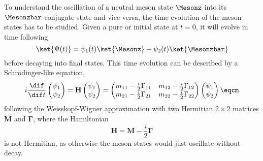 To understand the oscillation of a neutral meson state $\Mesonz$ into its
$\Mesonzbar$ \CP conjugate state and vice versa, the time evolution of the meson
states has to be studied. Given a pure \Mesonz or \Mesonzbar initial state at
$t=0$, it will evolve in time following
%
\begin{equation}
  \ket{\Psi(t)} = \psi_1(t) \ket{\Mesonz} + \psi_2(t) \ket{\Mesonzbar}
\end{equation}
%
before decaying into final states. This time evolution can be described by a
Schrödinger-like equation,
%
\begin{equation}
  i \frac{\dif}{\dif t} 
  \begin{pmatrix}
    \psi_1 \\
    \psi_2
  \end{pmatrix}
  =
  \mathbf{H}
  \begin{pmatrix}
    \psi_1 \\
    \psi_2
  \end{pmatrix}
  =
  \begin{pmatrix}
    m_{11} - \frac{i}{2} \Gamma_{11}    & m_{12} - \frac{i}{2} \Gamma_{12} \\
    m_{21} - \frac{i}{2} \Gamma_{21}    & m_{22} - \frac{i}{2} \Gamma_{22} \\
  \end{pmatrix}
  \begin{pmatrix}
    \psi_1 \\
    \psi_2
  \end{pmatrix}\eqcm
\end{equation}
%
following the Weisskopf-Wigner approximation
\cite{Weisskopf:1930au,Weisskopf:1930ps} with two Hermitian $2\times2$ matrices
$\mathbf{M}$ and $\mathbf{\Gamma}$, where the Hamiltonian
%
\begin{equation}
  \mathbf{H} = \mathbf{M} - \frac{i}{2} \mathbf{\Gamma}
\end{equation}
%
is not Hermitian, as otherwise the meson states would just oscillate without
decay.

